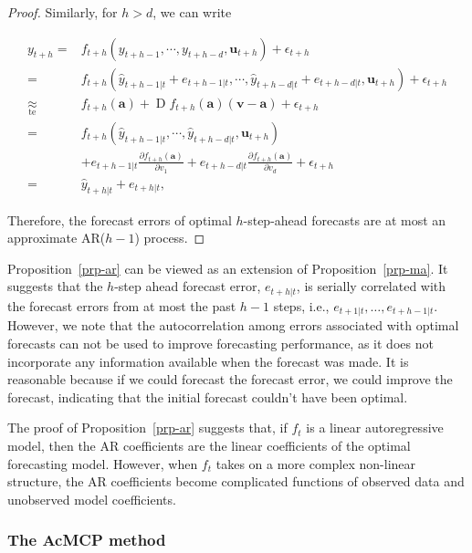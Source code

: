 \documentclass[
  11pt,
  a4paper,
]{article}
\theoremstyle{plain}
\theoremstyle{plain}
\theoremstyle{remark}
\begin{document}
\begin{proof}
Similarly, for \(h > d\), we can write

\[
\begin{aligned}
y_{t+h}
=&f_{t+h}\left(y_{t+h-1},\cdots,y_{t+h-d},\bm{u}_{t+h}\right)+\epsilon_{t+h} \\
=&f_{t+h}\left(\hat{y}_{t+h-1|t}+e_{t+h-1|t},\cdots,\hat{y}_{t+h-d|t}+e_{t+h-d|t},\bm{u}_{t+h}\right)+\epsilon_{t+h} \\
\underset{\text{te}}{\approx}&f_{t+h}\left(\bm{a}\right)+\operatorname{D}f_{t+h}\left(\bm{a}\right)\left(\bm{v}-\bm{a}\right)+
\epsilon_{t+h} \\
=&f_{t+h}\left(\hat{y}_{t+h-1|t},\cdots,\hat{y}_{t+h-d|t},\bm{u}_{t+h}\right) \\
&+e_{t+h-1|t}\frac{\partial f_{t+h}\left(\bm{a}\right)}{\partial v_1}+e_{t+h-d|t}\frac{\partial f_{t+h}\left(\bm{a}\right)}{\partial v_{d}}+\epsilon_{t+h} \\
=&\hat{y}_{t+h|t}+e_{t+h|t},
\end{aligned}
\]

Therefore, the forecast errors of optimal \(h\)-step-ahead forecasts are
at most an approximate AR(\(h-1\)) process.
\end{proof}

Proposition~\ref{prp-ar} can be viewed as an extension of
Proposition~\ref{prp-ma}. It suggests that the \(h\)-step ahead forecast
error, \(e_{t+h|t}\), is serially correlated with the forecast errors
from at most the past \(h-1\) steps, i.e.,
\(e_{t+1|t}, \ldots, e_{t+h-1|t}\). However, we note that the
autocorrelation among errors associated with optimal forecasts can not
be used to improve forecasting performance, as it does not incorporate
any information available when the forecast was made. It is reasonable
because if we could forecast the forecast error, we could improve the
forecast, indicating that the initial forecast couldn't have been
optimal.

The proof of Proposition~\ref{prp-ar} suggests that, if \(f_t\) is a
linear autoregressive model, then the AR coefficients are the linear
coefficients of the optimal forecasting model. However, when \(f_t\)
takes on a more complex non-linear structure, the AR coefficients become
complicated functions of observed data and unobserved model
coefficients.

\subsubsection{The AcMCP method}\label{sec-novel}
\end{document}
